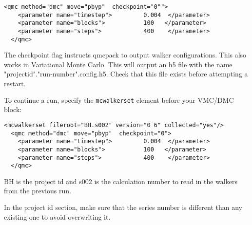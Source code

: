 \begin{itemize}
\begin{lstlisting}[style=QMCPXML,caption=The following is an example of running a simulation that can be restarted . ]
  <qmc method="dmc" move="pbyp"  checkpoint="0"">
    <parameter name="timestep">         0.004  </parameter>
    <parameter name="blocks">           100   </parameter>
    <parameter name="steps">            400    </parameter>
  </qmc>
\end{lstlisting}

The checkpoint flag instructs qmcpack to output walker configurations.  This also
works in Variational Monte Carlo.  This will output an h5 file with the name "projectid"."run-number".config.h5.
Check that this file exists before attempting a restart.

To continue a run, specify the \texttt{mcwalkerset} element before your VMC/DMC block:
\begin{lstlisting}[style=QMCPXML,caption=Restart (read walkers from previous run) ]
 <mcwalkerset fileroot="BH.s002" version="0 6" collected="yes"/>
  <qmc method="dmc" move="pbyp"  checkpoint="0">
    <parameter name="timestep">         0.004  </parameter>
    <parameter name="blocks">           100   </parameter>
    <parameter name="steps">            400    </parameter>
  </qmc>
\end{lstlisting}
BH is the project id and s002 is the calculation number to read in the walkers from the previous run.

In the project id section, make sure that the series number is different than any existing one to avoid overwriting it. 

\end{itemize}
